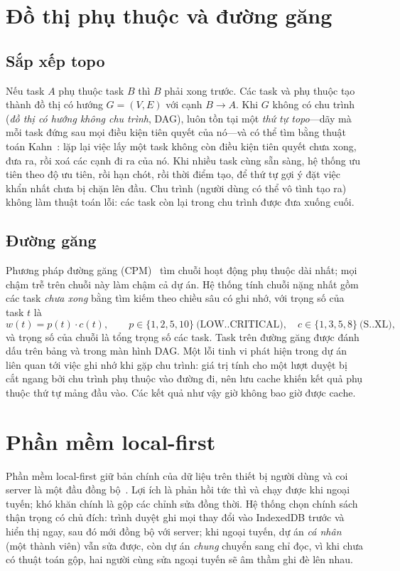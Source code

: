 \documentclass[../main.tex]{subfiles}
\begin{document}
\section{Đồ thị phụ thuộc và đường găng}
\subsection{Sắp xếp topo}
Nếu task $A$ phụ thuộc task $B$ thì $B$ phải xong trước. Các task và phụ thuộc tạo thành đồ thị có
hướng $G=(V,E)$ với cạnh $B \rightarrow A$. Khi $G$ không có chu trình (\emph{đồ thị có hướng không
chu trình}, DAG), luôn tồn tại một \emph{thứ tự topo}---dãy mà mỗi task đứng sau mọi điều kiện tiên
quyết của nó---và có thể tìm bằng thuật toán Kahn~\cite{kahn1962topological}: lặp lại việc lấy một
task không còn điều kiện tiên quyết chưa xong, đưa ra, rồi xoá các cạnh đi ra của nó. Khi nhiều task
cùng sẵn sàng, hệ thống ưu tiên theo độ ưu tiên, rồi hạn chót, rồi thời điểm tạo, để thứ tự gợi ý đặt
việc khẩn nhất chưa bị chặn lên đầu. Chu trình (người dùng có thể vô tình tạo ra) không làm thuật
toán lỗi: các task còn lại trong chu trình được đưa xuống cuối.

\subsection{Đường găng}
Phương pháp đường găng (CPM)~\cite{kelley1959cpm} tìm chuỗi hoạt động phụ thuộc dài nhất; mọi chậm
trễ trên chuỗi này làm chậm cả dự án. Hệ thống tính chuỗi nặng nhất gồm các task \emph{chưa xong} bằng
tìm kiếm theo chiều sâu có ghi nhớ, với trọng số của task $t$ là
\[
w(t) = p(t)\cdot c(t), \qquad
p \in \{1,2,5,10\}\ \text{(LOW..CRITICAL)},\quad
c \in \{1,3,5,8\}\ \text{(S..XL)},
\]
và trọng số của chuỗi là tổng trọng số các task. Task trên đường găng được đánh dấu trên bảng và
trong màn hình DAG. Một lỗi tinh vi phát hiện trong dự án liên quan tới việc ghi nhớ khi gặp chu
trình: giá trị tính cho một lượt duyệt bị cắt ngang bởi chu trình phụ thuộc vào đường đi, nên lưu
cache khiến kết quả phụ thuộc thứ tự mảng đầu vào. Các kết quả như vậy giờ không bao giờ được cache.

\section{Phần mềm local-first}
Phần mềm local-first giữ bản chính của dữ liệu trên thiết bị người dùng và coi server là một đầu
đồng bộ~\cite{kleppmann2019localfirst}. Lợi ích là phản hồi tức thì và chạy được khi ngoại tuyến;
khó khăn chính là gộp các chỉnh sửa đồng thời. Hệ thống chọn chính sách thận trọng có chủ đích: trình
duyệt ghi mọi thay đổi vào IndexedDB trước và hiển thị ngay, sau đó mới đồng bộ với server; khi
ngoại tuyến, dự án \emph{cá nhân} (một thành viên) vẫn sửa được, còn dự án \emph{chung} chuyển sang
chỉ đọc, vì khi chưa có thuật toán gộp, hai người cùng sửa ngoại tuyến sẽ âm thầm ghi đè lên nhau.
\end{document}
